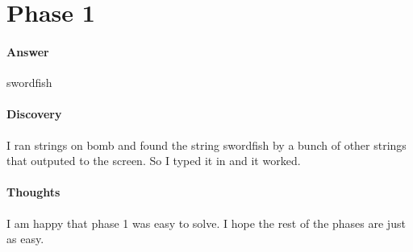 \documentclass[12pt]{article}
\begin{document}
\maketitle

\section{Phase 1}
\paragraph{Answer}
swordfish

\paragraph{Discovery}
I ran strings on bomb and found the string swordfish by a bunch of other strings that outputed to the screen. So I typed it in and it worked.

\paragraph{Thoughts}
I am happy that phase 1 was easy to solve. I hope the rest of the phases are just as easy.
\end{document}
